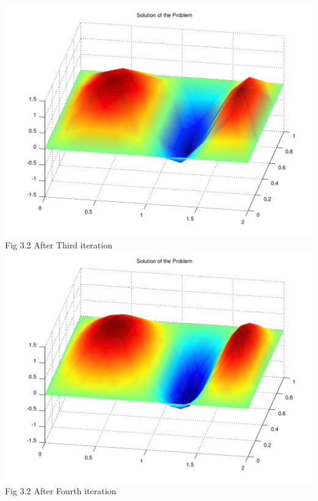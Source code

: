 \documentclass{report}
\numberwithin{equation}{chapter}
\begin{document}
\begin{center}
\includegraphics[scale=0.6]{3}\hspace*{70cm}\\
{Fig 3.2 After Third iteration}
\includegraphics[scale=0.6]{4}\hspace*{70cm}\\
{Fig 3.2 After Fourth iteration}
\end{center}
\end{document}
